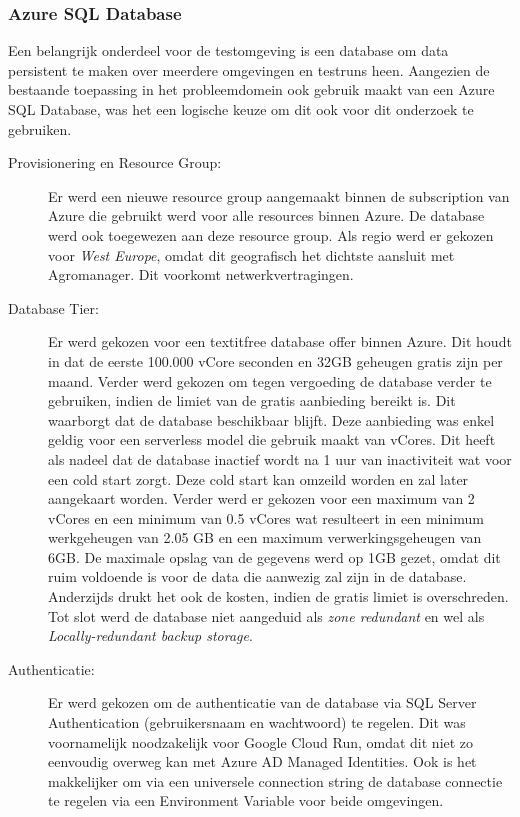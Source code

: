 \subsubsection*{Azure SQL Database}

Een belangrijk onderdeel voor de testomgeving is een database om data persistent te maken over meerdere omgevingen en testruns heen. Aangezien de bestaande toepassing in het probleemdomein ook gebruik maakt van een Azure SQL Database, was het een logische keuze om dit ook voor dit onderzoek te gebruiken.

\begin{description}
    \item[Provisionering en Resource Group:] 
    Er werd een nieuwe resource group aangemaakt binnen de subscription van Azure die gebruikt werd voor alle resources binnen Azure. De database werd ook toegewezen aan deze resource group. Als regio werd er gekozen voor \textit{West Europe}, omdat dit geografisch het dichtste aansluit met Agromanager. Dit voorkomt netwerkvertragingen.
    \item[Database Tier:]
    Er werd gekozen voor een textit{free database offer} binnen Azure. Dit houdt in dat de eerste 100.000 vCore seconden en 32GB geheugen gratis zijn per maand. Verder werd gekozen om tegen vergoeding de database verder te gebruiken, indien de limiet van de gratis aanbieding bereikt is. Dit waarborgt dat de database beschikbaar blijft. Deze aanbieding was enkel geldig voor een serverless model die gebruik maakt van vCores. Dit heeft als nadeel dat de database inactief wordt na 1 uur van inactiviteit wat voor een cold start zorgt. Deze cold start kan omzeild worden en zal later aangekaart worden. Verder werd er gekozen voor een maximum van 2 vCores en een minimum van 0.5 vCores wat resulteert in een minimum werkgeheugen van 2.05 GB en een maximum verwerkingsgeheugen van 6GB. De maximale opslag van de gegevens werd op 1GB gezet, omdat dit ruim voldoende is voor de data die aanwezig zal zijn in de database. Anderzijds drukt het ook de kosten, indien de gratis limiet is overschreden. Tot slot werd de database niet aangeduid als \textit{zone redundant} en wel als \textit{Locally-redundant backup storage}.
    \item[Authenticatie:]
    Er werd gekozen om de authenticatie van de database via SQL Server Authentication (gebruikersnaam en wachtwoord) te regelen. Dit was voornamelijk noodzakelijk voor Google Cloud Run, omdat dit niet zo eenvoudig overweg kan met Azure AD Managed Identities. Ook is het makkelijker om via een universele connection string de database connectie te regelen via een Environment Variable voor beide omgevingen. 

\end{description}
